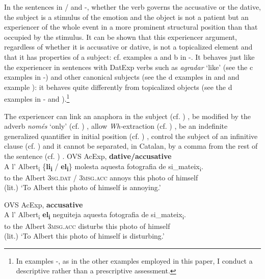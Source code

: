 \documentclass[output=paper,colorlinks,citecolor=brown,modfonts,nonflat]{langsci/langscibook}
\begin{document}
In the sentences in / and -, whether the verb governs the accusative or the dative, the subject is a stimulus of the emotion and the object is not a patient but an experiencer of the whole event in a more prominent structural position than that occupied by the stimulus. It can be shown that this experiencer argument, regardless of whether it is accusative or dative, is not a topicalized element and that it has properties of a subject: cf. examples {a} and {b} in -. It behaves just like the experiencer in sentences with DatExp verbs such as \textit{agradar} ‘like’ (see the {c} examples in -) and other canonical subjects (see the {d} examples in  and  and example ): it behaves quite differently from topicalized objects (see the {d} examples in - and ).\footnote{In examples -, as in the other examples employed in this paper, I conduct a descriptive rather than a prescriptive assessment.}

The experiencer can link an anaphora in the subject (cf. \citealt{Demonte1995, EgurenFernándezSoriano2004}) , be modified by the adverb \textit{només} ‘only’ (cf. \citealt{Cuervo1999}) , allow \textit{Wh-}extraction (cf. \citealt{BellettiRizzi1988}) , be an indefinite generalized quantifier in initial position (cf. \citealt{BellettiRizzi1988, Masullo1992quirky, Cuervo1999}) , control the subject of an infinitive clause (cf. \citealt{Campos1999, Alsina2008})  and it cannot be separated, in Catalan, by a comma from the rest of the sentence (cf. \citealt{Ginebra2003, Ginebra2005}) .
\textbf{}
\ea%
 \label{ex:royo:8}
 \ea OVS AcExp, \textbf{dative/accusative} \label{ex:royo:8a}\\
 \gll A l’ Albert\textsubscript{i} \{\textbf{li\textsubscript{i}} / \textbf{el\textsubscript{i}}\} molesta aquesta fotografia de si\_mateix\textsubscript{i}.\\
 to the Albert {\textsc{3sg.dat}} / {\textsc{3msg.acc}} annoys this photo       of himself\\
\glt (lit.) ‘To Albert this photo of himself is annoying.’


 \ex OVS AcExp, \textbf{accusative}\label{ex:royo:8c}\\
 \gll A l’ Albert\textsubscript{i} \textbf{el\textsubscript{i}} neguiteja aquesta fotografia de si\_mateix\textsubscript{i}.\\
 to the Albert  {\textsc{3msg.acc}} disturbs this photo of himself\\
\glt (lit.) ‘To Albert this photo of himself is disturbing.’
\end{document}
